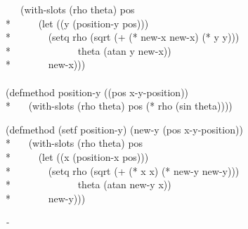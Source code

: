 \begin{defun}
\begin{lisp}
~~~(with-slots (rho theta) pos \\*
~~~~~(let ((y (position-y pos))) \\*
~~~~~~~(setq rho (sqrt (+ (* new-x new-x) (* y y))) \\*
~~~~~~~~~~~~~theta (atan y new-x)) \\*
~~~~~~~new-x))) \\
\\
(defmethod position-y ((pos x-y-position)) \\*
~~~(with-slots (rho theta) pos (* rho (sin theta))))
\end{lisp}
\begin{lisp}
(defmethod (setf position-y) (new-y (pos x-y-position)) \\*
~~~(with-slots (rho theta) pos \\*
~~~~~(let ((x (position-x pos))) \\*
~~~~~~~(setq rho (sqrt (+ (* x x) (* new-y new-y))) \\*
~~~~~~~~~~~~~theta (atan new-y x)) \\*
~~~~~~~new-y)))
\end{lisp}
\end{defun}

\newbox\hyphbox
\setbox\hyphbox\hbox\emph{-}
\def\foohyphen{\copy\hyphbox}

